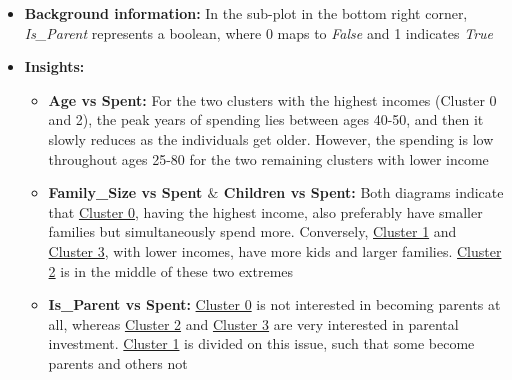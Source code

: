 \documentclass[11pt]{article}
\begin{document}
\vspace{1\baselineskip}
\begin{itemize}
	\item \textbf{Background information:} In the sub-plot in the bottom right corner, \textit{Is\_Parent} represents a boolean, where 0 maps to \textit{False} and 1 indicates \textit{True}

\end{itemize}
\vspace{1\baselineskip}
\begin{itemize}
	\item \textbf{Insights:}

\begin{itemize}
	\item \textbf{Age vs Spent:} For the two clusters with the highest incomes (Cluster 0 and 2), the peak years of spending lies between ages 40-50, and then it slowly reduces as the individuals get older. However, the spending is low throughout ages 25-80 for the two remaining clusters with lower income

	\item \textbf{Family\_Size vs Spent $\&$ Children vs Spent:} Both diagrams indicate that \uline{\textcolor[HTML]{BF9000}{Cluster 0}}, having the highest income, also preferably have smaller families but simultaneously spend more. Conversely, \uline{\textcolor[HTML]{0B5394}{Cluster 1}} and \uline{\textcolor[HTML]{674EA7}{Cluster 3}}, with lower incomes, have more kids and larger families. \uline{\textcolor[HTML]{38761D}{Cluster 2}} is in the middle of these two extremes

	\item \textbf{Is\_Parent vs Spent:} \uline{\textcolor[HTML]{BF9000}{Cluster 0}} is not interested in becoming parents at all, whereas \uline{\textcolor[HTML]{38761D}{Cluster 2}} and \uline{\textcolor[HTML]{674EA7}{Cluster 3}} are very interested in parental investment. \uline{\textcolor[HTML]{0B5394}{Cluster 1}} is divided on this issue, such that some become parents and others not

\end{itemize}
\end{itemize}
\vspace{1\baselineskip}
\end{document}
